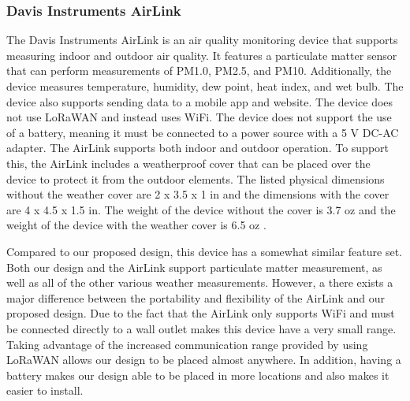 \subsubsection{Davis Instruments AirLink}
The Davis Instruments AirLink is an air quality monitoring device that supports measuring indoor and outdoor air quality. It features a particulate matter sensor that can perform measurements of PM1.0, PM2.5, and PM10. Additionally, the device measures temperature, humidity, dew point, heat index, and wet bulb. The device also supports sending data to a mobile app and website. The device does not use LoRaWAN and instead uses WiFi. The device does not support the use of a battery, meaning it must be connected to a power source with a 5 V DC-AC adapter. The AirLink supports both indoor and outdoor operation. To support this, the AirLink includes a weatherproof cover that can be placed over the device to protect it from the outdoor elements. The listed physical dimensions without the weather cover are 2 x 3.5 x 1 in and the dimensions with the cover are 4 x 4.5 x 1.5 in. The weight of the device without the cover is 3.7 oz and the weight of the device with the weather cover is 6.5 oz \cite{davis-airlink}.

Compared to our proposed design, this device has a somewhat similar feature set. Both our design and the AirLink support particulate matter measurement, as well as all of the other various weather measurements. However, a there exists a major difference between the portability and flexibility of the AirLink and our proposed design. Due to the fact that the AirLink only supports WiFi and must be connected directly to a wall outlet makes this device have a very small range. Taking advantage of the increased communication range provided by using LoRaWAN allows our design to be placed almost anywhere. In addition, having a battery makes our design able to be placed in more locations and also makes it easier to install.